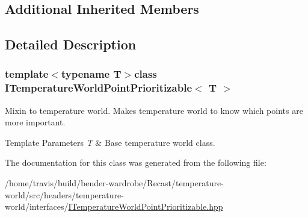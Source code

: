 \subsection*{Additional Inherited Members}


\subsection{Detailed Description}
\subsubsection*{template$<$typename T$>$class I\-Temperature\-World\-Point\-Prioritizable$<$ T $>$}

Mixin to temperature world. Makes temperature world to know which points are more important.


\begin{DoxyTemplParams}{Template Parameters}
{\em T} & Base temperature world class. \\
\hline
\end{DoxyTemplParams}


The documentation for this class was generated from the following file\-:\begin{DoxyCompactItemize}
\item 
/home/travis/build/bender-\/wardrobe/\-Recast/temperature-\/world/src/headers/temperature-\/world/interfaces/\hyperlink{_i_temperature_world_point_prioritizable_8hpp}{I\-Temperature\-World\-Point\-Prioritizable.\-hpp}\end{DoxyCompactItemize}
